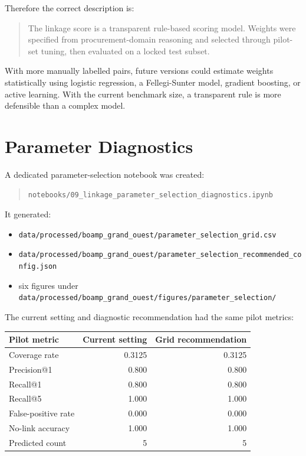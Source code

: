 \documentclass[11pt,a4paper]{article}
\newcommand{\pathcode}[1]{{\small\nolinkurl{#1}}}
\begin{document}
Therefore the correct description is:

\begin{quote}
The linkage score is a transparent rule-based scoring model. Weights were specified from procurement-domain reasoning and selected through pilot-set tuning, then evaluated on a locked test subset.
\end{quote}

With more manually labelled pairs, future versions could estimate weights statistically using logistic regression, a Fellegi-Sunter model, gradient boosting, or active learning. With the current benchmark size, a transparent rule is more defensible than a complex model.

\section*{Parameter Diagnostics}

A dedicated parameter-selection notebook was created:

\begin{quote}
\pathcode{notebooks/09_linkage_parameter_selection_diagnostics.ipynb}
\end{quote}

It generated:

\begin{itemize}
  \item \pathcode{data/processed/boamp_grand_ouest/parameter_selection_grid.csv}
  \item \pathcode{data/processed/boamp_grand_ouest/parameter_selection_recommended_config.json}
  \item six figures under \pathcode{data/processed/boamp_grand_ouest/figures/parameter_selection/}
\end{itemize}

The current setting and diagnostic recommendation had the same pilot metrics:

\begin{center}
\small
\begin{tabularx}{\textwidth}{Xrr}
\toprule
Pilot metric & Current setting & Grid recommendation \\
\midrule
Coverage rate & 0.3125 & 0.3125 \\
Precision@1 & 0.800 & 0.800 \\
Recall@1 & 0.800 & 0.800 \\
Recall@5 & 1.000 & 1.000 \\
False-positive rate & 0.000 & 0.000 \\
No-link accuracy & 1.000 & 1.000 \\
Predicted count & 5 & 5 \\
\bottomrule
\end{tabularx}
\end{center}
\end{document}
